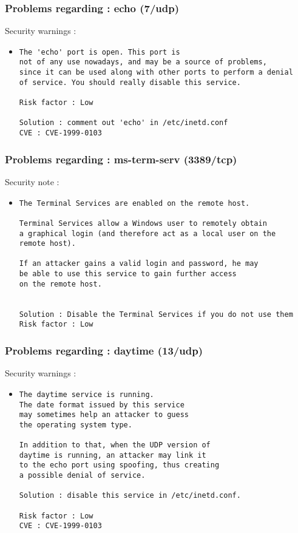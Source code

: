 \documentclass{article}
\begin{document}
\subsubsection{Problems regarding : echo (7/udp)}
Security warnings :\\
\begin{itemize}
\item \begin{verbatim}
The 'echo' port is open. This port is
not of any use nowadays, and may be a source of problems, 
since it can be used along with other ports to perform a denial
of service. You should really disable this service.

Risk factor : Low

Solution : comment out 'echo' in /etc/inetd.conf
CVE : CVE-1999-0103
\end{verbatim}\end{itemize}
\subsubsection{Problems regarding : ms-term-serv (3389/tcp)}
Security note :\\
\begin{itemize}
\item \begin{verbatim}
The Terminal Services are enabled on the remote host.

Terminal Services allow a Windows user to remotely obtain
a graphical login (and therefore act as a local user on the
remote host).

If an attacker gains a valid login and password, he may
be able to use this service to gain further access
on the remote host.


Solution : Disable the Terminal Services if you do not use them
Risk factor : Low
\end{verbatim}\end{itemize}
\subsubsection{Problems regarding : daytime (13/udp)}
Security warnings :\\
\begin{itemize}
\item \begin{verbatim}
The daytime service is running.
The date format issued by this service
may sometimes help an attacker to guess
the operating system type. 

In addition to that, when the UDP version of
daytime is running, an attacker may link it 
to the echo port using spoofing, thus creating
a possible denial of service.

Solution : disable this service in /etc/inetd.conf.

Risk factor : Low
CVE : CVE-1999-0103
\end{verbatim}\end{itemize}
\end{document}
